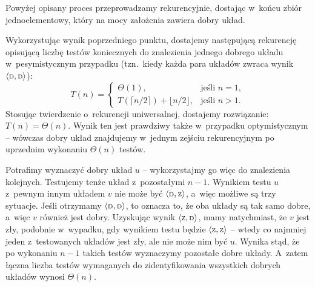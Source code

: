 Powyżej opisany proces przeprowadzamy rekurencyjnie, dostając w~końcu zbiór jednoelementowy, który na mocy założenia zawiera dobry układ.

\subproblem %
Wykorzystując wynik poprzedniego punktu, dostajemy następującą rekurencję opisującą liczbę testów koniecznych do znalezienia jednego dobrego układu w~pesymistycznym przypadku (tzn.\ kiedy każda para układów zwraca wynik $\langle{\scriptstyle\rm D},{\scriptstyle\rm D}\rangle$):
\[
	T(n) =
	\begin{cases}
		\Theta(1), & \text{jeśli $n=1$}, \\
		T(\lceil n/2\rceil)+\lfloor n/2\rfloor, & \text{jeśli $n>1$}.
	\end{cases}
\]
Stosując twierdzenie o~rekurencji uniwersalnej, dostajemy rozwiązanie: $T(n)=\Theta(n)$.
Wynik ten jest prawdziwy także w~przypadku optymistycznym -- wówczas dobry układ znajdujemy w~jednym zejściu rekurencyjnym po uprzednim wykonaniu $\Theta(n)$ testów.

Potrafimy wyznaczyć dobry układ $u$ -- wykorzystajmy go więc do znalezienia kolejnych.
Testujemy tenże układ z~pozostałymi $n-1$.
Wynikiem testu $u$ z~pewnym innym układem $v$ nie może być $\langle{\scriptstyle\rm D},{\scriptstyle\rm Z}\rangle$, a~więc możliwe są trzy sytuacje.
Jeśli otrzymamy $\langle{\scriptstyle\rm D},{\scriptstyle\rm D}\rangle$, to oznacza to, że oba układy są tak samo dobre, a~więc $v$ również jest dobry.
Uzyskując wynik $\langle{\scriptstyle\rm Z},{\scriptstyle\rm D}\rangle$, mamy natychmiast, że $v$ jest zły, podobnie w~wypadku, gdy wynikiem testu będzie $\langle{\scriptstyle\rm Z},{\scriptstyle\rm Z}\rangle$ -- wtedy co najmniej jeden z~testowanych układów jest zły, ale nie może nim być $u$.
Wynika stąd, że po wykonaniu $n-1$ takich testów wyznaczymy pozostałe dobre układy.
A~zatem łączna liczba testów wymaganych do zidentyfikowania wszystkich dobrych układów wynosi $\Theta(n)$.
